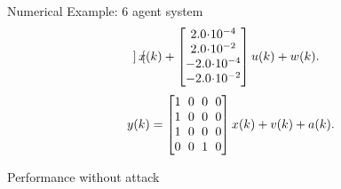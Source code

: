 \documentclass[10pt]{beamer}
\begin{document}
\begin{frame}{Numerical Example: 6 agent system}
{\begin{align*}
\begin{bmatrix}
	\end{bmatrix}x(k)+\begin{bmatrix}
	2.0\hspace{-2pt}\cdot\hspace{-2pt} 10^{-4}\\
	2.0\hspace{-2pt}\cdot\hspace{-2pt} 10^{-2}\\
	-2.0\hspace{-2pt}\cdot\hspace{-2pt} 10^{-4}\\
	-2.0\hspace{-2pt}\cdot\hspace{-2pt} 10^{-2}
      \end{bmatrix}
      u(k)+w(k).
    \end{align*}
    \begin{align*}
      y(k)=
      \begin{bmatrix}
	1\hspace{-2pt}&\hspace{-2pt} 0 \hspace{-2pt}&\hspace{-2pt}0 \hspace{-2pt}&\hspace{-2pt}0\\
	1\hspace{-2pt}&\hspace{-2pt} 0 \hspace{-2pt}&\hspace{-2pt}0 \hspace{-2pt}&\hspace{-2pt}0\\
	1\hspace{-2pt}&\hspace{-2pt} 0 \hspace{-2pt}&\hspace{-2pt}0 \hspace{-2pt}&\hspace{-2pt}0\\
	0\hspace{-2pt}&\hspace{-2pt} 0 \hspace{-2pt}&\hspace{-2pt}1 \hspace{-2pt}&\hspace{-2pt}0
      \end{bmatrix}x(k)+v(k)+a(k).
  \end{align*} }
\end{frame}
\begin{frame}{Performance without attack}
  \begin{figure}[htpb!]
    \centering
    \scalebox{0.65}{}
  \end{figure}
\end{frame}
\end{document}
